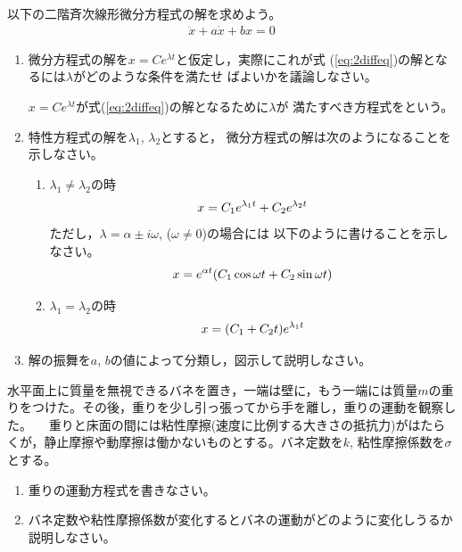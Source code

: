 \documentclass[twocolumn,11pt]{jarticle}
\begin{document}
以下の二階斉次線形微分方程式の解を求めよう。
\begin{align}
  \label{eq:2diffeq}
  \ddot{x}+a\dot{x}+bx=0
\end{align}
\begin{enumerate}
\item 微分方程式の解を$x=Ce^{\lambda t}$と仮定し，実際にこれが式
  (\ref{eq:2diffeq})の解となるには$\lambda$がどのような条件を満たせ
  ばよいかを議論しなさい。

  \comment
  $x=Ce^{\lambda t}$が式(\ref{eq:2diffeq})の解となるために$\lambda$が
  満たすべき方程式をという。
\item 特性方程式の解を$\lambda_1$, $\lambda_2$とすると，
  微分方程式の解は次のようになることを示しなさい。
  \begin{enumerate}
  \item $\lambda_1\ne\lambda_2$の時
    \begin{align}
      x=C_1e^{\lambda_1t}+C_2e^{\lambda_2t}\notag
    \end{align}
    ただし，$\lambda=\alpha\pm i\omega$, ($\omega\ne 0$)の場合には
    以下のように書けることを示しなさい。
    \begin{align}
      x=e^{\alpha t}(C_1\cos{\omega t}+C_2\sin{\omega t})\notag
    \end{align}
  \item $\lambda_1=\lambda_2$の時
    \begin{align}
      x=(C_1+C_2t)e^{\lambda_1t}\notag
    \end{align}
  \end{enumerate}
\item 解の振舞を$a$, $b$の値によって分類し，図示して説明しなさい。
\end{enumerate}

\nquestion
水平面上に質量を無視できるバネを置き，一端は壁に，もう一端には質量$m$の重りをつけた。その後，重りを少し引っ張ってから手を離し，重りの運動を観察した。
　重りと床面の間には粘性摩擦(速度に比例する大きさの抵抗力)がはたらくが，静止摩擦や動摩擦は働かないものとする。バネ定数を$k$, 粘性摩擦係数を$\sigma$とする。
\begin{enumerate}
	\item 重りの運動方程式を書きなさい。
	\item バネ定数や粘性摩擦係数が変化するとバネの運動がどのように変化しうるか説明しなさい。
\end{enumerate}
\end{document}
